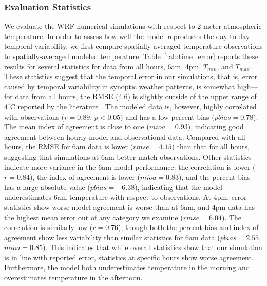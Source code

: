 \documentclass[draft,linenumbers]{agujournal}
\begin{document}
\subsubsection{Evaluation Statistics}
We evaluate the WRF numerical simulations with respect to 2-meter atmospheric temperature. In order to assess how well the model reproduces the day-to-day temporal variability, we first compare spatially-averaged temperature observations to spatially-averaged modeled temperature. 
Table~\ref{tab:time_error} reports these results for several statistics for data from all hours, 6am, 4pm, $T_{min}$, and $T_{max}$.  
These statistics suggest that the temporal error in our simulations, that is, error caused by temporal variability in synoptic weather patterns, is somewhat high---for data from all hours, the RMSE (4.6) is slightly outside of the upper range of $4^\circ$C reported by the literature \citep{kim2013evaluation}. 
The modeled data is, however, highly correlated with observations ($r=0.89$, $p<0.05$) and has a low percent bias ($pbias = 0.78$). The mean index of agreement is close to one ($mioa=0.93$), indicating good agreement between hourly model and observational data.
Compared with all hours, the RMSE for 6am data is lower ($rmse= 4.15$) than that for all hours, suggesting that simulations at 6am better match observations. 
Other statistics indicate more variance in the 6am model performance: the correlation is lower ($r=0.84$), the index of agreement is lower ($mioa=0.83$), and the percent bias has a large absolute value ($pbias=-6.38$), indicating that the model underestimates 6am temperature with respect to observations. 
%
At 4pm, error statistics show worse model agreement is worse than at 6am,  %
and 4pm data has the highest mean error out of any category we examine ($rmse=6.04$). The correlation is similarly low ($r=0.76$), though both the percent bias and index of agreement show less variability than similar statistics for 6am data ($pbias=2.55$, $mioa=0.85$). This indicates that while overall statistics show that our simulation is in line with reported error, statistics at specific hours show worse agreement. Furthermore, the model both underestimates temperature in the morning and overestimates temperature in the afternoon. %
\end{document}
